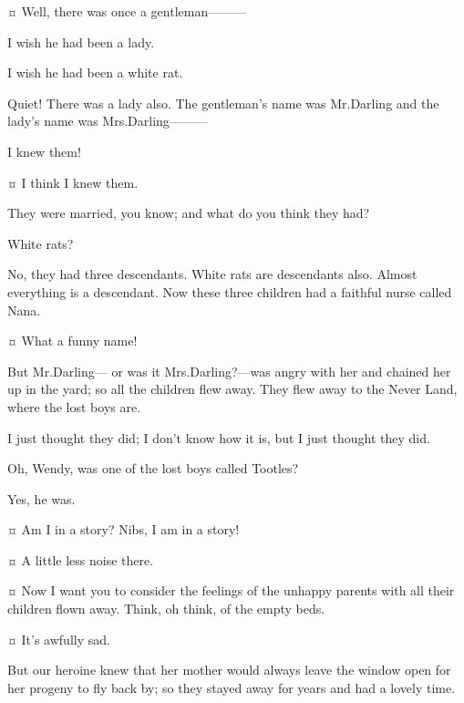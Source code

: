 \begin{drama}
\wendyspeaks {}¤
Well, there was once a gentleman———

\curlyspeaks
I wish he had been a lady.

\nibsspeaks
I wish he had been a white rat.

\wendyspeaks
Quiet!
There was a lady also.
The gentleman's name was Mr.\@ Darling and the lady's name was Mrs.\@ Darling———

\johnspeaks
I knew them!

\michaelspeaks {}¤
I think I knew them.

\wendyspeaks
They were married, you know; and what do you think they had?

\nibsspeaks
White rats?

\wendyspeaks
No, they had three descendants.
White rats are descendants also.
Almost everything is a descendant.
Now these three children had a faithful nurse called Nana.

\michaelspeaks {}¤
What a funny name!

\wendyspeaks
But Mr.\@ Darling— or was it Mrs.\@ Darling?—was angry with her
and chained her up in the yard;
so all the children flew away.
They flew away to the Never Land, where the lost boys are.

\curlyspeaks
I just thought they did;
I don't know how it is, but I just thought they did.

\tootlesspeaks
Oh, Wendy, was one of the lost boys called Tootles?

\wendyspeaks
Yes, he was.

\tootlesspeaks {}¤
Am I in a story?
Nibs, I am in a story!

\peterspeaks {}¤
A little less noise there.

\wendyspeaks {}¤
Now I want you to consider the feelings of the unhappy parents with all their children flown away.
Think, oh think, of the empty beds.

\firsttwinspeaks {}¤
It's awfully sad.

\wendyspeaks
But our heroine knew that her mother would always leave the window open for her progeny to fly back by;
so they stayed away for years and had a lovely time.


\end{drama}
